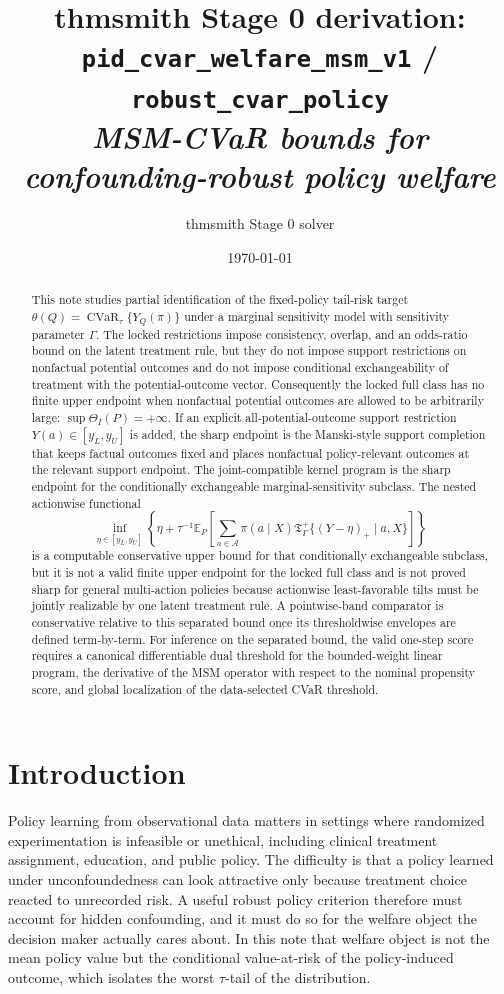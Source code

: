\documentclass[11pt]{article}
\title{thmsmith Stage 0 derivation: \texttt{pid\_cvar\_welfare\_msm\_v1} / \texttt{robust\_cvar\_policy}%
  \\ \large\textit{MSM-CVaR bounds for confounding-robust policy welfare}}
\author{thmsmith Stage 0 solver}
\date{\today}
\newcommand{\E}{\mathbb{E}}
\theoremstyle{definition}
\theoremstyle{plain}
\theoremstyle{remark}
\begin{document}
\maketitle

\begin{abstract}
This note studies partial identification of the fixed-policy tail-risk target
\(\theta(Q)=\operatorname{CVaR}_{\tau}\{Y_Q(\pi)\}\) under a marginal
sensitivity model with sensitivity parameter \(\Gamma\).  The locked
restrictions impose consistency, overlap, and an odds-ratio bound on the latent
treatment rule, but they do not impose support restrictions on nonfactual
potential outcomes and do not impose conditional exchangeability of treatment
with the potential-outcome vector.  Consequently the locked full class has no
finite upper endpoint when nonfactual potential outcomes are allowed to be
arbitrarily large: \(\sup\Theta_I(P)=+\infty\).  If an explicit
all-potential-outcome support restriction \(Y(a)\in[y_L,y_U]\) is added, the
sharp endpoint is the Manski-style support completion that keeps factual
outcomes fixed and places nonfactual policy-relevant outcomes at the relevant
support endpoint.  The joint-compatible kernel program is the sharp endpoint for
the conditionally exchangeable marginal-sensitivity subclass.  The nested
actionwise functional
\[
\inf_{\eta\in[y_L,y_U]}
\left\{
\eta+\tau^{-1}\E_P\left[
\sum_{a\in\mathcal A}\pi(a\mid X)
\mathfrak T_{\Gamma}^{+}\{(Y-\eta)_+\mid a,X\}
\right]\right\}
\]
is a computable conservative upper bound for that conditionally exchangeable
subclass, but it is not a valid finite upper endpoint for the locked full class
and is not proved sharp for general multi-action policies because actionwise
least-favorable tilts must be jointly realizable by one latent treatment rule.
A pointwise-band comparator is conservative relative to this separated bound
once its thresholdwise envelopes are defined term-by-term.  For inference on the
separated bound, the valid one-step score requires a canonical differentiable
dual threshold for the bounded-weight linear program, the derivative of the MSM
operator with respect to the nominal propensity score, and global localization
of the data-selected CVaR threshold.
\end{abstract}

\section{Introduction}
Policy learning from observational data matters in settings where randomized
experimentation is infeasible or unethical, including clinical treatment
assignment, education, and public policy.  The difficulty is that a policy
learned under unconfoundedness can look attractive only because treatment choice
reacted to unrecorded risk.  A useful robust policy criterion therefore must
account for hidden confounding, and it must do so for the welfare object the
decision maker actually cares about.  In this note that welfare object is not
the mean policy value but the conditional value-at-risk of the policy-induced
outcome, which isolates the worst \(\tau\)-tail of the distribution.
\end{document}
